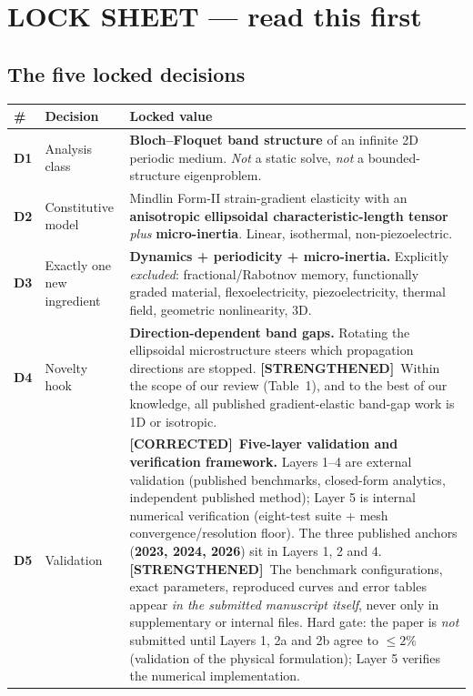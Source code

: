 \documentclass[11pt,a4paper]{article}
\newcommand{\STR}{{\color{strcol}\textbf{[STRENGTHENED]}}}
\newcommand{\COR}{{\color{corcol}\textbf{[CORRECTED]}}}
\begin{document}
\tableofcontents
\newpage

\section{LOCK SHEET --- read this first}

\subsection{The five locked decisions}

{\small
\begin{tabularx}{\textwidth}{@{}>{\bfseries}p{0.5cm} L{3.6cm} Y@{}}
\toprule
\# & Decision & Locked value \\
\midrule
D1 & Analysis class & \textbf{Bloch--Floquet band structure} of an infinite 2D periodic medium.
       \emph{Not} a static solve, \emph{not} a bounded-structure eigenproblem. \\
D2 & Constitutive model & Mindlin Form-II strain-gradient elasticity with an
       \textbf{anisotropic ellipsoidal characteristic-length tensor} \emph{plus}
       \textbf{micro-inertia}. Linear, isothermal, non-piezoelectric. \\
D3 & Exactly one new ingredient & \textbf{Dynamics + periodicity + micro-inertia.}
       Explicitly \emph{excluded}: fractional/Rabotnov memory, functionally graded
       material, flexoelectricity, piezoelectricity, thermal field, geometric
       nonlinearity, 3D. \\
D4 & Novelty hook & \textbf{Direction-dependent band gaps.} Rotating the ellipsoidal
       microstructure steers which propagation directions are stopped. \STR\ Within the scope of our review (Table~1), and to the best of our knowledge, all published gradient-elastic band-gap work is 1D or isotropic. \\
D5 & Validation & \COR\ \textbf{Five-layer validation and verification framework.} Layers 1--4 are external validation (published benchmarks, closed-form analytics, independent published method); Layer 5 is internal numerical verification (eight-test suite + mesh convergence/resolution floor). The three published anchors (\textbf{2023, 2024, 2026}) sit in Layers 1, 2 and 4. \STR\ The benchmark configurations, exact parameters, reproduced curves and error tables appear \emph{in the submitted manuscript itself}, never only in supplementary or internal files. Hard gate: the paper is \emph{not} submitted until Layers 1, 2a and 2b agree to $\le 2\%$ (validation of the physical formulation); Layer 5 verifies the numerical implementation. \\
\bottomrule
\end{tabularx}
}
\end{document}

